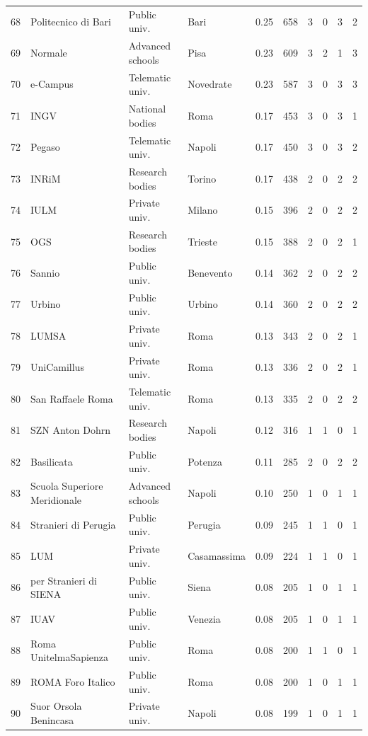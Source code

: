 \documentclass[11pt,a4paper]{article}
\begin{document}
{\begin{longtable}{rlllrrrrrr}
68 & Politecnico di Bari & Public univ. & Bari & 0.25 & 658 & 3 & 0 & 3 & 2 \\
69 & Normale & Advanced schools & Pisa & 0.23 & 609 & 3 & 2 & 1 & 3 \\
70 & e-Campus & Telematic univ. & Novedrate & 0.23 & 587 & 3 & 0 & 3 & 3 \\
71 & INGV & National bodies & Roma & 0.17 & 453 & 3 & 0 & 3 & 1 \\
72 & Pegaso & Telematic univ. & Napoli & 0.17 & 450 & 3 & 0 & 3 & 2 \\
73 & INRiM & Research bodies & Torino & 0.17 & 438 & 2 & 0 & 2 & 2 \\
74 & IULM & Private univ. & Milano & 0.15 & 396 & 2 & 0 & 2 & 2 \\
75 & OGS & Research bodies & Trieste & 0.15 & 388 & 2 & 0 & 2 & 1 \\
76 & Sannio & Public univ. & Benevento & 0.14 & 362 & 2 & 0 & 2 & 2 \\
77 & Urbino & Public univ. & Urbino & 0.14 & 360 & 2 & 0 & 2 & 2 \\
78 & LUMSA & Private univ. & Roma & 0.13 & 343 & 2 & 0 & 2 & 1 \\
79 & UniCamillus & Private univ. & Roma & 0.13 & 336 & 2 & 0 & 2 & 1 \\
80 & San Raffaele Roma & Telematic univ. & Roma & 0.13 & 335 & 2 & 0 & 2 & 2 \\
81 & SZN Anton Dohrn & Research bodies & Napoli & 0.12 & 316 & 1 & 1 & 0 & 1 \\
82 & Basilicata & Public univ. & Potenza & 0.11 & 285 & 2 & 0 & 2 & 2 \\
83 & Scuola Superiore Meridionale & Advanced schools & Napoli & 0.10 & 250 & 1 & 0 & 1 & 1 \\
84 & Stranieri di Perugia & Public univ. & Perugia & 0.09 & 245 & 1 & 1 & 0 & 1 \\
85 & LUM & Private univ. & Casamassima & 0.09 & 224 & 1 & 1 & 0 & 1 \\
86 & per Stranieri di SIENA & Public univ. & Siena & 0.08 & 205 & 1 & 0 & 1 & 1 \\
87 & IUAV & Public univ. & Venezia & 0.08 & 205 & 1 & 0 & 1 & 1 \\
88 & Roma UnitelmaSapienza & Public univ. & Roma & 0.08 & 200 & 1 & 1 & 0 & 1 \\
89 & ROMA Foro Italico & Public univ. & Roma & 0.08 & 200 & 1 & 0 & 1 & 1 \\
90 & Suor Orsola Benincasa & Private univ. & Napoli & 0.08 & 199 & 1 & 0 & 1 & 1 \\

\end{longtable}}
\end{document}
